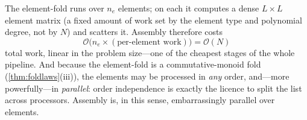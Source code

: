 The element-fold runs over $n_e$ elements; on each it computes a dense
$L\times L$ element matrix (a fixed amount of work set by the element type and
polynomial degree, not by $N$) and scatters it. Assembly therefore costs
\begin{equation}
\mathcal{O}\bigl(n_e\times(\text{per-element work})\bigr)
=\mathcal{O}(N)
\label{eq:asmcost}
\end{equation}
total work, linear in the problem size---one of the cheapest stages of the whole
pipeline. And because the element-fold is a commutative-monoid fold
(\cref{thm:foldlaws}(iii)), the elements may be processed in \emph{any} order,
and---more powerfully---in \emph{parallel}: order independence is exactly the
licence to split the list across processors. Assembly is, in this sense,
embarrassingly parallel over elements.

